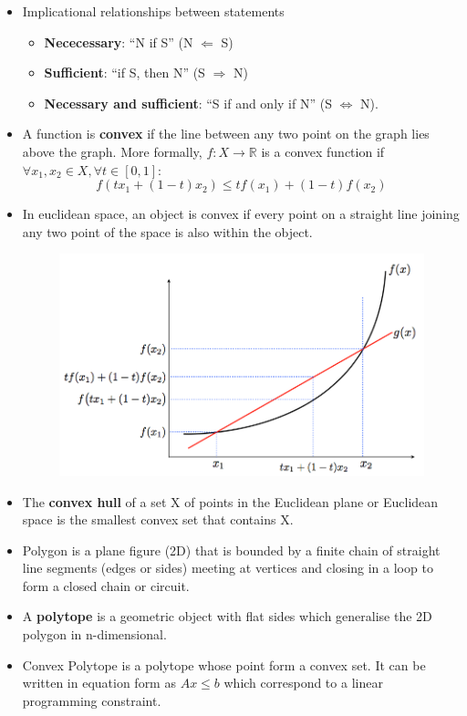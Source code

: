 \documentclass[twocolumn]{article}
\numberwithin{equation}{section}
\begin{document}
\begin{itemize}
	\item Implicational relationships between statements
	\begin{itemize}
		\item \textbf{Nececessary}: ``N if S'' (N $\Leftarrow$ S)
		\item \textbf{Sufficient}: ``if S, then N'' (S $\Rightarrow$ N)
		\item \textbf{Necessary and sufficient}: ``S if and only if N'' (S $\Leftrightarrow$ N).
		\end{itemize}
	\item A function is \textbf{convex} if the line between any two point on the graph lies above the graph. More formally, $f : X \rightarrow \mathbb{R}$ is a convex function if $\forall x_1, x_2 \in X, \forall t \in [0, 1]$:
$$f(tx_1+(1-t)x_2)\leq t f(x_1)+(1-t)f(x_2)$$
	\item In euclidean space, an object is convex if every point on a straight line joining any two point of the space is also within the object.
\begin{figure}[H]
\centering
    \includegraphics[width=.30\textwidth]{convex.png}
\end{figure}
	\item The \textbf{convex hull} of a set X of points in the Euclidean plane or Euclidean space is the smallest convex set that contains X.
	\item Polygon is a plane figure (2D) that is bounded by a finite chain of straight line segments (edges or sides) meeting at vertices and closing in a loop to form a closed chain or circuit.
	\item A \textbf{polytope} is a geometric object with flat sides which generalise the 2D polygon in n-dimensional.
	\item Convex Polytope is a polytope whose point form a convex set. It can be written in equation form as $Ax \leq b$ which correspond to a linear programming constraint.
\end{itemize}
\end{document}

